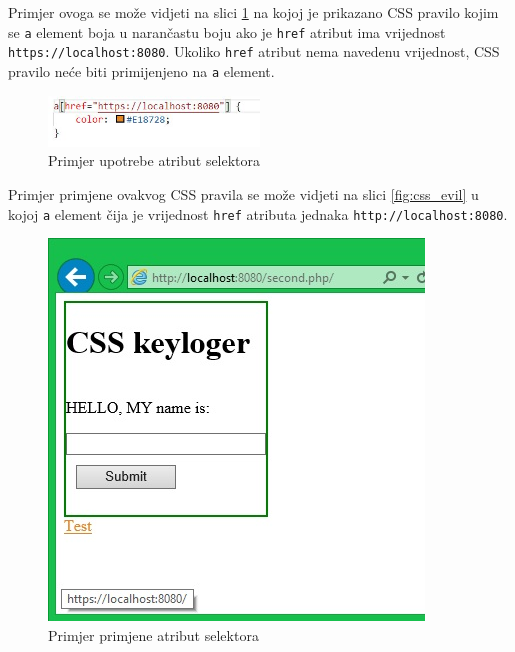 \documentclass[12pt, oneside, onecolumn]{book}
\begin{document}
{ Primjer ovoga se može vidjeti na slici \ref{fig:css_as} na kojoj je prikazano CSS pravilo kojim se \texttt{a} element boja u narančastu boju ako je \texttt{href} atribut ima vrijednost \texttt{https://localhost:8080}. Ukoliko \texttt{href} atribut nema navedenu vrijednost, CSS pravilo neće biti primijenjeno na \texttt{a} element.

\begin{figure}[H]
	\begin{center}
		\includegraphics[width=0.5\textwidth]{css_as.jpg}
		\caption{Primjer upotrebe atribut selektora} \label{fig:css_as}
	\end{center}
\end{figure}

Primjer primjene ovakvog CSS pravila se može vidjeti na slici \ref{fig:css_evil} u kojoj \texttt{a} element čija je vrijednost \texttt{href} atributa jednaka \texttt{http://localhost:8080}.

\begin{figure}[H]
	\begin{center}
		\includegraphics[width=\textwidth]{css_ex.jpg}
		\caption{Primjer primjene atribut selektora} \label{fig:css_ex}
	\end{center}
\end{figure}

}
\end{document}

